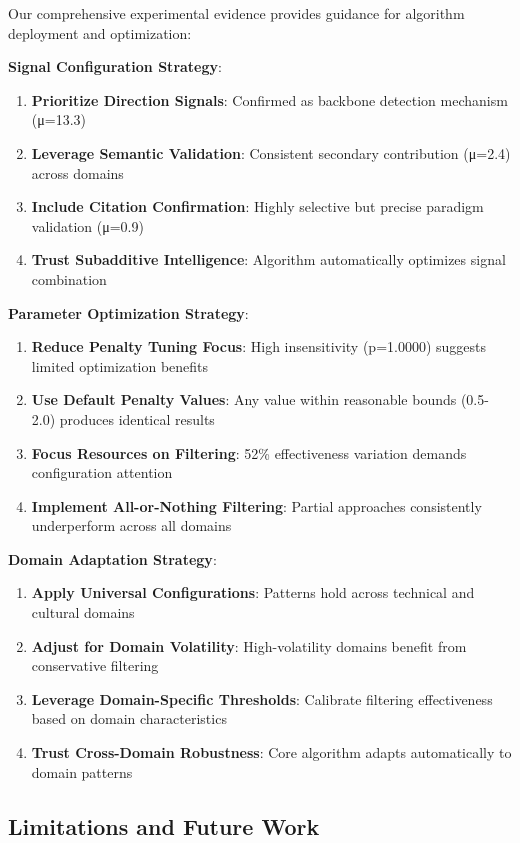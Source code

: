 \documentclass[conference]{IEEEtran}
\begin{document}
Our comprehensive experimental evidence provides guidance for algorithm deployment and optimization:

\textbf{Signal Configuration Strategy}:
\begin{enumerate}
\item \textbf{Prioritize Direction Signals}: Confirmed as backbone detection mechanism (μ=13.3)
\item \textbf{Leverage Semantic Validation}: Consistent secondary contribution (μ=2.4) across domains
\item \textbf{Include Citation Confirmation}: Highly selective but precise paradigm validation (μ=0.9)
\item \textbf{Trust Subadditive Intelligence}: Algorithm automatically optimizes signal combination
\end{enumerate}

\textbf{Parameter Optimization Strategy}:
\begin{enumerate}
\item \textbf{Reduce Penalty Tuning Focus}: High insensitivity (p=1.0000) suggests limited optimization benefits
\item \textbf{Use Default Penalty Values}: Any value within reasonable bounds (0.5-2.0) produces identical results
\item \textbf{Focus Resources on Filtering}: 52\% effectiveness variation demands configuration attention
\item \textbf{Implement All-or-Nothing Filtering}: Partial approaches consistently underperform across all domains
\end{enumerate}

\textbf{Domain Adaptation Strategy}:
\begin{enumerate}
\item \textbf{Apply Universal Configurations}: Patterns hold across technical and cultural domains
\item \textbf{Adjust for Domain Volatility}: High-volatility domains benefit from conservative filtering
\item \textbf{Leverage Domain-Specific Thresholds}: Calibrate filtering effectiveness based on domain characteristics
\item \textbf{Trust Cross-Domain Robustness}: Core algorithm adapts automatically to domain patterns
\end{enumerate}

\subsection{Limitations and Future Work}
\end{document}
